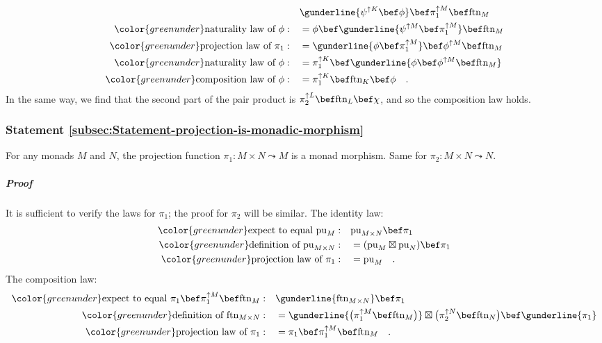 \begin{align*}
 & \gunderline{\psi^{\uparrow K}\bef\phi}\bef\pi_{1}^{\uparrow M}\bef\text{ftn}_{M}\\
{\color{greenunder}\text{naturality law of }\phi:}\quad & =\phi\bef\gunderline{\psi^{\uparrow M}\bef\pi_{1}^{\uparrow M}}\bef\text{ftn}_{M}\\
{\color{greenunder}\text{projection law of }\pi_{1}:}\quad & =\gunderline{\phi\bef\pi_{1}^{\uparrow M}}\bef\phi^{\uparrow M}\bef\text{ftn}_{M}\\
{\color{greenunder}\text{naturality law of }\phi:}\quad & =\pi_{1}^{\uparrow K}\bef\gunderline{\phi\bef\phi^{\uparrow M}\bef\text{ftn}_{M}}\\
{\color{greenunder}\text{composition law of }\phi:}\quad & =\pi_{1}^{\uparrow K}\bef\text{ftn}_{K}\bef\phi\quad.
\end{align*}
In the same way, we find that the second part of the pair product
is $\pi_{2}^{\uparrow L}\bef\text{ftn}_{L}\bef\chi$, and so the composition
law holds.

\subsubsection{Statement \label{subsec:Statement-projection-is-monadic-morphism}\ref{subsec:Statement-projection-is-monadic-morphism}}

For any monads $M$ and $N$, the projection function $\pi_{1}:M\times N\leadsto M$
is a monad morphism. Same for $\pi_{2}:M\times N\leadsto N$.

\subparagraph{Proof}

It is sufficient to verify the laws for $\pi_{1}$; the proof for
$\pi_{2}$ will be similar. The identity law:
\begin{align*}
{\color{greenunder}\text{expect to equal }\text{pu}_{M}:}\quad & \text{pu}_{M\times N}\bef\pi_{1}\\
{\color{greenunder}\text{definition of }\text{pu}_{M\times N}:}\quad & =(\text{pu}_{M}\boxtimes\text{pu}_{N})\bef\pi_{1}\\
{\color{greenunder}\text{projection law of }\pi_{1}:}\quad & =\text{pu}_{M}\quad.
\end{align*}
The composition law:
\begin{align*}
{\color{greenunder}\text{expect to equal }\pi_{1}\bef\pi_{1}^{\uparrow M}\bef\text{ftn}_{M}:}\quad & \gunderline{\text{ftn}_{M\times N}}\bef\pi_{1}\\
{\color{greenunder}\text{definition of }\text{ftn}_{M\times N}:}\quad & =\gunderline{\big(\pi_{1}^{\uparrow M}\bef\text{ftn}_{M}\big)}\boxtimes\big(\pi_{2}^{\uparrow N}\bef\text{ftn}_{N}\big)\bef\gunderline{\pi_{1}}\\
{\color{greenunder}\text{projection law of }\pi_{1}:}\quad & =\pi_{1}\bef\pi_{1}^{\uparrow M}\bef\text{ftn}_{M}\quad.
\end{align*}


